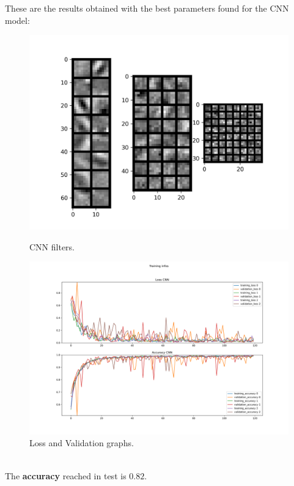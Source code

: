 \documentclass{report}
\begin{document}
These are the results obtained with the best parameters found for the CNN model:
\begin{figure}[ht!]
  \centering
  \begin{minipage}[b]{0.7\linewidth}
    \includegraphics[width=\linewidth]{3.CNN_500_sample/CNN_filters.png}
    \caption{CNN filters.}
    \label{fig:image1}
  \end{minipage}
  \hspace{0.5cm}
  \begin{minipage}[b]{0.7\linewidth}
    \includegraphics[width=\linewidth]{3.CNN_500_sample/training_infos.png}
    \caption{Loss and Validation graphs.}
    \label{fig:image2}
  \end{minipage}
\end{figure}\\
The \textbf{accuracy} reached in test is $0.82$.\\
\pagebreak
\end{document}
